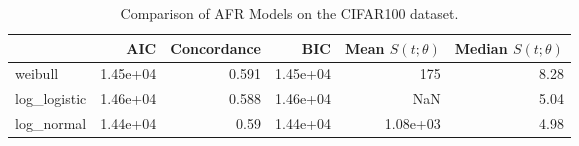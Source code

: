 \begin{table*}
	\centering
	\caption{Comparison of AFR Models on the CIFAR100 dataset.}
	\label{tab:cifar100}
	\begin{tabular}{lrrrrr}
		\toprule
		{}            & AIC      & Concordance & BIC      & Mean $S(t;\theta)$ & Median $S(t;\theta)$ \\
		\midrule
		weibull       & 1.45e+04 & 0.591       & 1.45e+04 & 175                                & 8.28                                 \\
		log\_logistic & 1.46e+04 & 0.588       & 1.46e+04 & NaN                                & 5.04                                 \\
		log\_normal   & 1.44e+04 & 0.59        & 1.44e+04 & 1.08e+03                           & 4.98                                 \\
		\bottomrule
	\end{tabular}
\end{table*}
